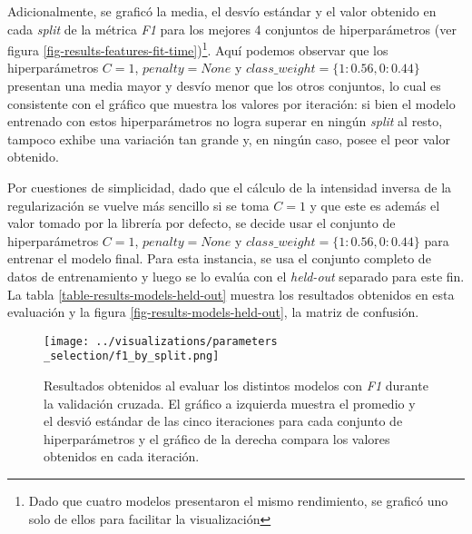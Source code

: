 Adicionalmente, se grafic\'o la media, el desv\'io est\'andar y el valor
obtenido en cada \textit{split} de la m\'etrica \textit{F1}
para los mejores 4 conjuntos de hiperpar\'ametros
(ver figura \ref{fig-results-features-fit-time})\footnote{Dado
que cuatro modelos presentaron el mismo rendimiento, se grafic\'o uno solo
de ellos para facilitar la visualizaci\'on}.
Aqu\'i podemos observar que los hiperpar\'ametros $C=1$, $penalty=None$
y $class\_weight=\lbrace1:0.56,0:0.44\rbrace$
presentan una media mayor y desv\'io menor que los otros
conjuntos, lo cual es consistente con el gr\'afico que muestra
los valores por iteraci\'on: si bien el modelo entrenado con estos hiperpar\'ametros
no logra superar en ning\'un \textit{split} al resto, tampoco exhibe
una variaci\'on tan grande y, en ning\'un caso, posee el peor valor
obtenido.
\par
Por cuestiones de simplicidad, dado que el c\'alculo de la intensidad inversa
de la regularizaci\'on se vuelve m\'as sencillo si se toma $C=1$ y que este es
adem\'as el valor tomado por la librería por defecto, se decide usar el conjunto
de hiperparámetros $C=1$, $penalty=None$ y
$class\_weight=\lbrace1:0.56,0:0.44\rbrace$ para entrenar el modelo final.
Para esta instancia, se usa el conjunto completo de datos de entrenamiento y luego
se lo eval\'ua con el \textit{held-out} separado para este fin. La tabla
\ref{table-results-models-held-out} muestra los resultados obtenidos en
esta evaluaci\'on y la figura \ref{fig-results-models-held-out}, la matriz
de confusi\'on.

\begin{figure}[h!]
    \centering
    \texttt{[image: ../visualizations/parameters\\\_selection/f1\_by\_split.png]}
    \caption{Resultados obtenidos al evaluar los distintos modelos con
    \textit{F1} durante la validaci\'on cruzada. El gr\'afico a izquierda muestra el
    promedio y el desvi\'o est\'andar de las cinco iteraciones para cada conjunto
    de hiperpar\'ametros y el gr\'afico de la derecha compara los valores obtenidos en
    cada iteraci\'on.}
    \label{fig-results-models-f1}
\end{figure}

